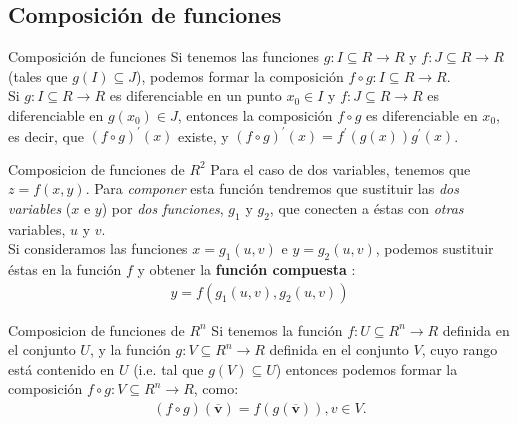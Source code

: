 \documentclass[a4paper, twoside]{article}
\numberwithin{equation}{section}
\numberwithin{figure}{section}
\numberwithin{table}{section}
\newcommand{\vect}[1]{\overline{\textbf{#1}}}
\begin{document}
\subsection{Composición de funciones}
\begin{definicion*}{Composición de funciones}
	Si tenemos las funciones $g: I \subseteq R \rightarrow R$ y $f: J \subseteq R \rightarrow R$ (tales que $g(I) \subseteq J$), podemos formar la composición $f\circ g:I\subseteq R \rightarrow R$.\\
			
	Si $g:I\subseteq R \rightarrow R$ es diferenciable en un punto $x_0 \in I$ y $f:J\subseteq R \rightarrow R$ es diferenciable en $g(x_0)\in J$, entonces la composición $f\circ g$ es diferenciable en $x_0$, es decir, que $(f\circ g)^\prime(x)$ existe, y $(f\circ g)^\prime(x)=f^{\prime}(g(x))g^{\prime}(x)$.
\end{definicion*}

\begin{definicion*}{Composicion de funciones de $R^2$}
	Para el caso de dos variables, tenemos que $z=f(x,y)$. Para \emph{componer} esta función tendremos que sustituir las \textit{dos variables} ($x$ e $y$) por \textit{dos funciones}, $g_1$ y $g_2$, que conecten a éstas con \textit{otras} variables,  $u$ y $v$.\\
	
	Si consideramos las funciones $x=g_1(u,v)$ e $y=g_2(u,v)$, podemos sustituir éstas en la función $f$ y obtener la \textbf{función compuesta} :
	\begin{align}
		y=f(g_1(u,v),g_2(u,v))
	\end{align}
\end{definicion*}

\begin{definicion*}{Composicion de funciones de $R^n$}
	Si tenemos la función $f: U \subseteq R^n \rightarrow R$ definida en el conjunto $U$, y la función $g: V \subseteq R^n \rightarrow R$ definida en el conjunto $V$, cuyo rango está contenido en $U$ (i.e. tal que $g(V) \subseteq U$) entonces podemos formar la composición $f\circ g:V\subseteq R^n \rightarrow R$, como:
	\begin{align}
		(f\circ g)(\vect{v})=f(g(\vect{v})),v\in V.
	\end{align}
\end{definicion*}
\end{document}
